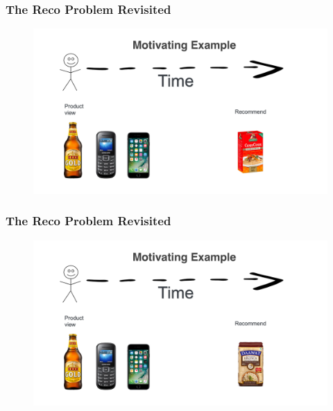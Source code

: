  \begin{frame}
  \frametitle{The Reco Problem Revisited}
 
 
   \begin{figure}[h!]
     \includegraphics[scale=0.3]{images/mot_ex3.png}
       \centering
       \label{motex1}
   \end{figure}
     
 \end{frame}

 \begin{frame}
  \frametitle{The Reco Problem Revisited}
 
 
   \begin{figure}[h!]
     \includegraphics[scale=0.3]{images/mot_ex4.png}
       \centering
       \label{motex1}
   \end{figure}
     
 \end{frame}



